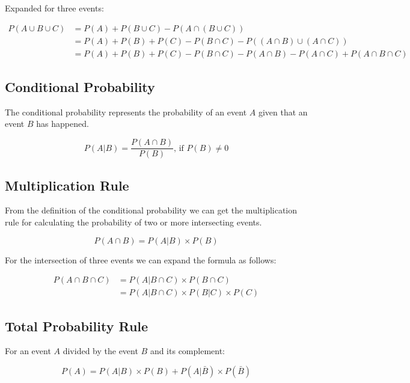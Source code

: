 \documentclass[a4paper, 10pt]{article}
\begin{document}
	\noindent Expanded for three events:

	\begin{align*}
		P(A\cup B\cup C) &= P(A) + P(B\cup C) - P(A\cap (B\cup C)) \\
		&= P(A) + P(B) + P(C) - P(B\cap C) - P((A\cap B)\cup (A\cap C)) \\
		&= P(A) + P(B) + P(C)- P(B\cap C) - P(A\cap B) - P(A\cap C) + P(A\cap B\cap C)
	\end{align*}

	\subsection{Conditional Probability}

	The conditional probability represents the probability of an event \(A\) given that an event \(B\) has happened.

	\begin{equation*}
		P(A|B)=\frac{P(A\cap B)}{P(B)}\text{, if }P(B)\neq 0
	\end{equation*}

	\subsection{Multiplication Rule}

	From the definition of the conditional probability we can get the multiplication rule for calculating the probability of two or more intersecting events.

	\begin{equation*}
		P(A\cap B)=P(A|B)\times P(B)
	\end{equation*}

	\noindent For the intersection of three events we can expand the formula as follows:

	\begin{align*}
		P(A\cap B\cap C) &= P(A|B\cap C)\times P(B\cap C) \\
		&= P(A|B\cap C)\times P(B|C)\times P(C)
	\end{align*}

	\subsection{Total Probability Rule}

	For an event \(A\) divided by the event \(B\) and its complement:

	\begin{equation*}
		P(A)=P(A|B)\times P(B)+P(A|\bar{B})\times P(\bar{B})
	\end{equation*}
\end{document}
